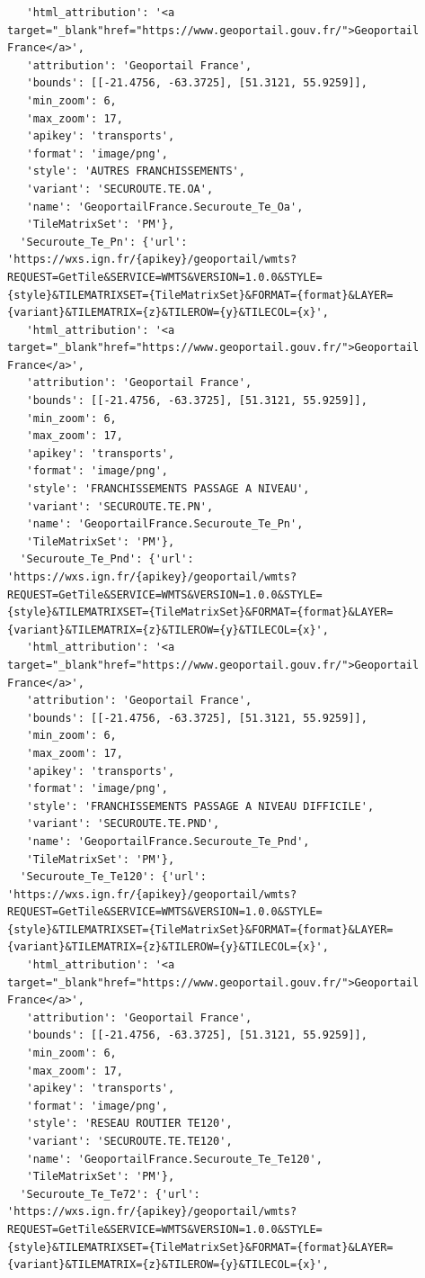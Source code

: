 \documentclass[
  letterpaper,
  DIV=11,
  numbers=noendperiod]{scrreprt}
\begin{document}
\begin{verbatim}
   'html_attribution': '<a target="_blank"href="https://www.geoportail.gouv.fr/">Geoportail France</a>',
   'attribution': 'Geoportail France',
   'bounds': [[-21.4756, -63.3725], [51.3121, 55.9259]],
   'min_zoom': 6,
   'max_zoom': 17,
   'apikey': 'transports',
   'format': 'image/png',
   'style': 'AUTRES FRANCHISSEMENTS',
   'variant': 'SECUROUTE.TE.OA',
   'name': 'GeoportailFrance.Securoute_Te_Oa',
   'TileMatrixSet': 'PM'},
  'Securoute_Te_Pn': {'url': 'https://wxs.ign.fr/{apikey}/geoportail/wmts?REQUEST=GetTile&SERVICE=WMTS&VERSION=1.0.0&STYLE={style}&TILEMATRIXSET={TileMatrixSet}&FORMAT={format}&LAYER={variant}&TILEMATRIX={z}&TILEROW={y}&TILECOL={x}',
   'html_attribution': '<a target="_blank"href="https://www.geoportail.gouv.fr/">Geoportail France</a>',
   'attribution': 'Geoportail France',
   'bounds': [[-21.4756, -63.3725], [51.3121, 55.9259]],
   'min_zoom': 6,
   'max_zoom': 17,
   'apikey': 'transports',
   'format': 'image/png',
   'style': 'FRANCHISSEMENTS PASSAGE A NIVEAU',
   'variant': 'SECUROUTE.TE.PN',
   'name': 'GeoportailFrance.Securoute_Te_Pn',
   'TileMatrixSet': 'PM'},
  'Securoute_Te_Pnd': {'url': 'https://wxs.ign.fr/{apikey}/geoportail/wmts?REQUEST=GetTile&SERVICE=WMTS&VERSION=1.0.0&STYLE={style}&TILEMATRIXSET={TileMatrixSet}&FORMAT={format}&LAYER={variant}&TILEMATRIX={z}&TILEROW={y}&TILECOL={x}',
   'html_attribution': '<a target="_blank"href="https://www.geoportail.gouv.fr/">Geoportail France</a>',
   'attribution': 'Geoportail France',
   'bounds': [[-21.4756, -63.3725], [51.3121, 55.9259]],
   'min_zoom': 6,
   'max_zoom': 17,
   'apikey': 'transports',
   'format': 'image/png',
   'style': 'FRANCHISSEMENTS PASSAGE A NIVEAU DIFFICILE',
   'variant': 'SECUROUTE.TE.PND',
   'name': 'GeoportailFrance.Securoute_Te_Pnd',
   'TileMatrixSet': 'PM'},
  'Securoute_Te_Te120': {'url': 'https://wxs.ign.fr/{apikey}/geoportail/wmts?REQUEST=GetTile&SERVICE=WMTS&VERSION=1.0.0&STYLE={style}&TILEMATRIXSET={TileMatrixSet}&FORMAT={format}&LAYER={variant}&TILEMATRIX={z}&TILEROW={y}&TILECOL={x}',
   'html_attribution': '<a target="_blank"href="https://www.geoportail.gouv.fr/">Geoportail France</a>',
   'attribution': 'Geoportail France',
   'bounds': [[-21.4756, -63.3725], [51.3121, 55.9259]],
   'min_zoom': 6,
   'max_zoom': 17,
   'apikey': 'transports',
   'format': 'image/png',
   'style': 'RESEAU ROUTIER TE120',
   'variant': 'SECUROUTE.TE.TE120',
   'name': 'GeoportailFrance.Securoute_Te_Te120',
   'TileMatrixSet': 'PM'},
  'Securoute_Te_Te72': {'url': 'https://wxs.ign.fr/{apikey}/geoportail/wmts?REQUEST=GetTile&SERVICE=WMTS&VERSION=1.0.0&STYLE={style}&TILEMATRIXSET={TileMatrixSet}&FORMAT={format}&LAYER={variant}&TILEMATRIX={z}&TILEROW={y}&TILECOL={x}',

\end{verbatim}
\end{document}
